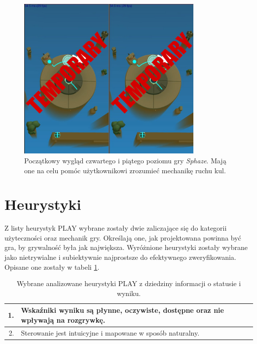 \documentclass[a4paper,12pt,numbers=noenddot]{report}
\begin{document}
\begin{figure}[h!]
	\centering
  	\includegraphics[height=8cm]{fig/tmp2.jpg}
	\caption{Początkowy wygląd czwartego i piątego poziomu gry \textit{Sphaze}. Mają one na celu pomóc użytkownikowi zrozumieć mechanikę ruchu kul.}
	\label{fig:tut_L3_2}
\end{figure}

\section{Heurystyki}
Z listy heurystyk PLAY \cite{ArticlePLAY} wybrane zostały dwie zaliczające się do kategorii użyteczności oraz mechanik gry. Określają one, jak projektowana powinna być gra, by grywalność była jak największa. Wyróżnione heurystyki zostały wybrane jako nietrywialne i subiektywnie najprostsze do efektywnego zweryfikowania. Opisane one zostały w tabeli \ref{tab:tab1}.

\begin{table}[h!]
  \centering
  \caption{Wybrane analizowane heurystyki PLAY z dziedziny informacji o statusie i wyniku.}
  \label{tab:tab1}
  \begin{tabular}{|r|l|}
    \hline
    1. & Wskaźniki wyniku są płynne, oczywiste, dostępne oraz nie wpływają na rozgrywkę.\\
    \hline
    2. & Sterowanie jest intuicyjne i mapowane w sposób naturalny.\\
    \hline
  \end{tabular}
\end{table}
\end{document}
